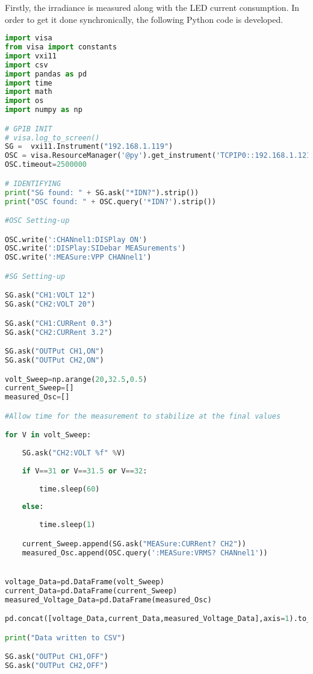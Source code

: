 Firstly, the irradiance is measured along with the \acrshort{LED} current consumption.  In order to get it done synchronically, the following Python code is developed.



\begin{lstlisting}[language=Python, caption=Polling based measurements script]
import visa
from visa import constants
import vxi11
import csv
import pandas as pd
import time
import math
import os
import numpy as np

# GPIB INIT
# visa.log_to_screen()
SG =  vxi11.Instrument("192.168.1.119")
OSC = visa.ResourceManager('@py').get_instrument('TCPIP0::192.168.1.121::inst0::INSTR')
OSC.timeout=2500000

# IDENTIFYING
print("SG found: " + SG.ask("*IDN?").strip())
print("OSC found: " + OSC.query('*IDN?').strip())

#OSC Setting-up

OSC.write(':CHANnel1:DISPlay ON')
OSC.write(':DISPlay:SIDebar MEASurements')
OSC.write(':MEASure:VPP CHANnel1')

#SG Setting-up

SG.ask("CH1:VOLT 12")
SG.ask("CH2:VOLT 20")

SG.ask("CH1:CURRent 0.3")
SG.ask("CH2:CURRent 3.2")

SG.ask("OUTPut CH1,ON")
SG.ask("OUTPut CH2,ON")

volt_Sweep=np.arange(20,32.5,0.5)
current_Sweep=[]
measured_Osc=[]

#Allow time for the measurement to stabilize at the final values

for V in volt_Sweep:
	
	SG.ask("CH2:VOLT %f" %V)
	
	if V==31 or V==31.5 or V==32:
	
		time.sleep(60)
		
	else:
	
		time.sleep(1)	

	current_Sweep.append(SG.ask("MEASure:CURRent? CH2"))	
	measured_Osc.append(OSC.query(':MEASure:VRMS? CHANnel1'))


voltage_Data=pd.DataFrame(volt_Sweep)
current_Data=pd.DataFrame(current_Sweep)
measured_Voltage_Data=pd.DataFrame(measured_Osc)

pd.concat([voltage_Data,current_Data,measured_Voltage_Data],axis=1).to_csv("data5.csv")

print("Data written to CSV")

SG.ask("OUTPut CH1,OFF")
SG.ask("OUTPut CH2,OFF")

\end{lstlisting}


